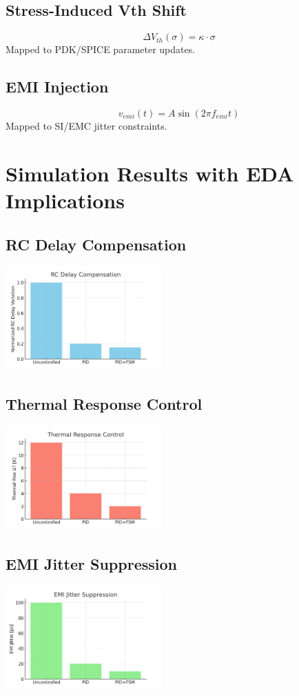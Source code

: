 \documentclass[conference]{IEEEtran}
\begin{document}
\subsection{Stress-Induced Vth Shift}
\[
\Delta V_{th}(\sigma)=\kappa \cdot \sigma
\]
Mapped to PDK/SPICE parameter updates.

\subsection{EMI Injection}
\[
v_{emi}(t)=A\sin(2\pi f_{emi} t)
\]
Mapped to SI/EMC jitter constraints.

\section{Simulation Results with EDA Implications}
\subsection{RC Delay Compensation}
\includegraphics[width=0.45\textwidth]{sim_delay_rc.png}

\subsection{Thermal Response Control}
\includegraphics[width=0.45\textwidth]{sim_thermal_response.png}

\subsection{EMI Jitter Suppression}
\includegraphics[width=0.45\textwidth]{sim_emi_jitter.png}
\end{document}
